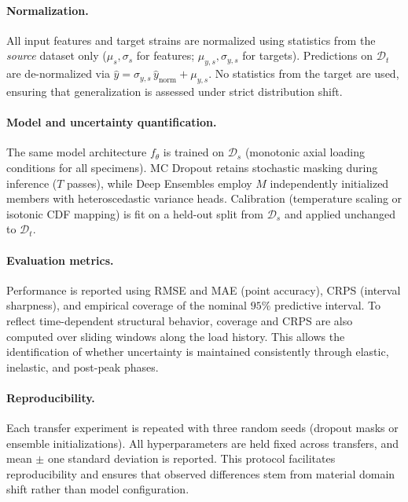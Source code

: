 \documentclass{article}
\begin{document}
\paragraph{Normalization.}  
All input features and target strains are normalized using statistics from the 
\emph{source} dataset only ($\mu_s, \sigma_s$ for features; 
$\mu_{y,s}, \sigma_{y,s}$ for targets). Predictions on $\mathcal{D}_t$ are de-normalized 
via $\hat{y} = \sigma_{y,s}\,\hat{y}_{\mathrm{norm}} + \mu_{y,s}$. 
No statistics from the target are used, ensuring that generalization is assessed 
under strict distribution shift.

\paragraph{Model and uncertainty quantification.}  
The same model architecture $f_\theta$ is trained on $\mathcal{D}_s$ 
(monotonic axial loading conditions for all specimens). 
MC Dropout retains stochastic masking during inference ($T$ passes), 
while Deep Ensembles employ $M$ independently initialized members 
with heteroscedastic variance heads. Calibration (temperature scaling or isotonic CDF mapping) 
is fit on a held-out split from $\mathcal{D}_s$ and applied unchanged to $\mathcal{D}_t$.

\paragraph{Evaluation metrics.}  
Performance is reported using RMSE and MAE (point accuracy), CRPS (interval sharpness), 
and empirical coverage of the nominal $95\%$ predictive interval. 
To reflect time-dependent structural behavior, coverage and CRPS are also computed 
over sliding windows along the load history. 
This allows the identification of whether uncertainty is maintained consistently 
through elastic, inelastic, and post-peak phases.

\paragraph{Reproducibility.}  
Each transfer experiment is repeated with three random seeds (dropout masks or ensemble initializations). 
All hyperparameters are held fixed across transfers, and mean $\pm$ one standard deviation is reported. 
This protocol facilitates reproducibility and ensures that observed differences 
stem from material domain shift rather than model configuration.
\end{document}
